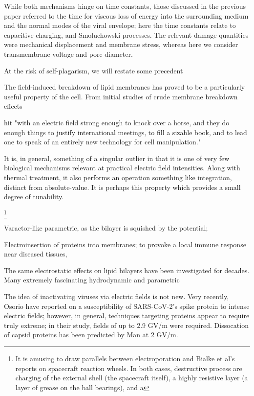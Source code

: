 \documentclass[fleqn,10pt]{paper}
\begin{document}
While both mechanisms hinge on time constants, those discussed in the previous paper referred to the time for viscous loss of energy into the surrounding medium and the normal modes of the viral envelope; here the time constants relate to capacitive charging, and Smoluchowski processes. The relevant damage quantities were mechanical displacement and membrane stress, whereas here we consider transmembrane voltage and pore diameter. 

At the risk of self-plagarism, we will restate some precedent

The field-induced breakdown of lipid membranes has proved to be a particularly useful property of the cell. From initial studies of crude membrane breakdown effects \cite{Reversible1979}

hit "with an electric field strong enough to knock over a horse, and they do enough things to justify international meetings, to fill a sizable book, and to lead one to speak of an entirely new technology for cell manipulation."

It is, in general, something of a singular outlier in that it is one of very few biological mechanisms relevant at practical electric field intensities. Along with thermal treatment, it also performs an operation something like integration, distinct from absolute-value. It is perhaps this property which provides a small degree of tunability.

\footnote{It is amusing to draw parallels between electroporation and Bialke et al's reports on spacecraft reaction wheels. In both cases, destructive process are charging of the external shell (the spacecraft itself), a highly resistive layer (a layer of grease on the ball bearings), and a }


Varactor-like parametric, as the bilayer is squished by the potential; 

Electroinsertion of proteins into membranes\cite{Clinical1996}; to provoke a local immune response near diseased tissues, 

The same electrostatic effects on lipid bilayers have been investigated for decades. Many extremely fascinating hydrodynamic and parametric 

The idea of inactivating viruses via electric fields is not new. Very recently, Osorio \cite{Receptor2021} have reported on a susceptibility of SARS-CoV-2's spike protein to intense electric fields; however, in general, techniques targeting proteins appear to require truly extreme; in their study, fields of up to 2.9 GV/m were required. Dissocation of capsid proteins has been predicted by Man \cite{Picosecond2016b} at 2 GV/m.
\end{document}
